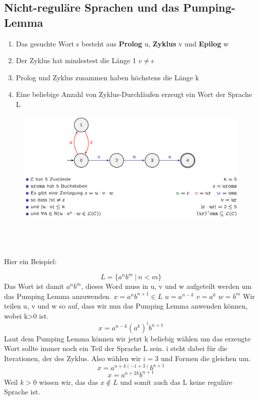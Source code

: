 \documentclass[12pt,a4paper]{article}
\begin{document}
\subsection{Nicht-reguläre Sprachen und das Pumping-Lemma}
\begin{enumerate}
	\item Das gesuchte Wort s besteht aus \textbf{Prolog} u, \textbf{Zyklus} v und \textbf{Epilog} w
	\item Der Zyklus hat mindestest die Länge 1 $v \neq \epsilon$
	\item Prolog und Zyklus zusammen haben höchstens die Länge k
	\item Eine beliebige Anzahl von Zyklus-Durchläufen erzeugt ein Wort der Sprache L
\end{enumerate}
\begin{center}
	\begin{figure}[!h]
		\includegraphics[width=\textwidth]{Bilder/PumpingLemma.png}
	\end{figure}
\end{center}
~\\~\\~\\
Hier ein Beispiel:

$$L=\{a^n b^m ~|~ n<m\}$$ \newline
Das Wort ist damit $a^n b^m$, dieses Word muss in u, v und w aufgeteilt werden um das Pumping Lemma anzuwenden. \newline
$x = a^nb^{n+1} \in L$ \newline
$u = a^{n-k}$ \newline
$v = a^k$ \newline
$w = b^m$ \newline
Wir teilen u, v und w so auf, dass wir nun das Pumping Lemma anwenden können, wobei k>0 ist.
$$x = a^{n-k}(a^k)^ib^{n+1}$$
Laut dem Pumping Lemma können wir jetzt k beliebig wählen um das erzeugte Wort sollte immer noch ein Teil der Sprache L sein. i steht dabei für die Iterationen, der des Zyklus. \newline
Also wählen wir $ i = 3$ und Formen die gleichen um.
$$x = a^{n + k(-1 +3)}b^{n+1}$$
$$x = a^{n + 2k}b^{n+1}$$
Weil $k>0$ wissen wir, das das $x \notin L$ und somit auch das L keine reguläre Sprache ist.
\end{document}
